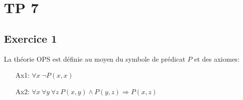 \section{TP 7}



% 
% 

\subsection*{Exercice 1}
La th\'{e}orie OPS est d\'{e}finie au moyen du symbole de pr\'{e}dicat $P$ et des axiomes:
\begin{enumerate}
\item[Ax1:] $\forall x \ \neg P(x, x)$
\item[Ax2:] $\forall x \ \forall y \ \forall z \ P(x, y) \wedge P(y, z) \Rightarrow P(x, z)$
\end{enumerate}

